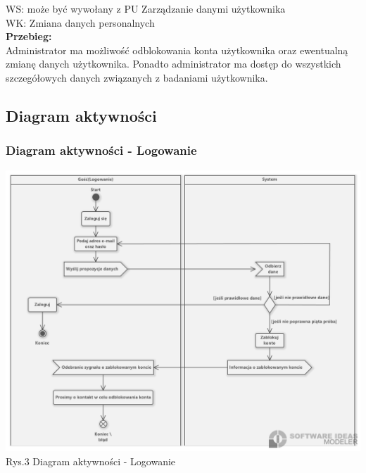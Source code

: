 \documentclass[12pt, letterpaper]{article}
\begin{document}
		WS: może być wywołany z PU Zarządzanie danymi użytkownika\\
		
		WK: Zmiana danych personalnych\\
		
		\textbf{Przebieg:}\\
		Administrator ma możliwość odblokowania konta użytkownika oraz ewentualną zmianę danych użytkownika. Ponadto administrator ma dostęp do wszystkich szczegółowych danych związanych z badaniami użytkownika.
		 \\
		

		

		\subsection{Diagram aktywności}
		
		\subsubsection{Diagram aktywności - Logowanie}
		
		\begin{center}
			\includegraphics[scale=0.5]{aclogowanie}\\
			\caption{Rys.3 Diagram aktywności - Logowanie}
		\end{center}	
		
\end{document}
